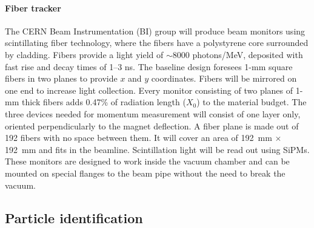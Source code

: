 \paragraph{Fiber tracker}
The CERN Beam Instrumentation (BI) group will produce
 beam monitors %
 using scintillating fiber technology, where %
 the fibers have a polystyrene core surrounded by cladding\cite{Scifi}. Fibers provide a light yield of $\sim$8000 photons/MeV, deposited with fast rise and decay times of 1--3 ns. The baseline design foresees 1-mm square fibers in two planes to provide $x$ and $y$ coordinates. Fibers will be mirrored on one end to increase
light collection.  Every monitor consisting of two planes of 1-mm thick fibers adds 0.47\% of radiation length ($X_0$) to the material budget. 
The three devices needed for momentum measurement will consist of one layer only, oriented perpendicularly to the magnet deflection.
A fiber plane is made out of 192 fibers with no space between them. It will cover an area of 192~mm $\times$ 192~mm and fits in the beamline.
Scintillation light will be read out using SiPMs.
%
These monitors are designed to work inside the vacuum chamber and can be mounted on special flanges to the beam pipe without the need to break the vacuum.


\subsection{Particle identification}

